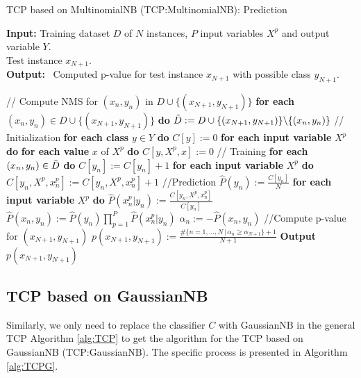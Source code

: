 \documentclass[10pt]{reportMaster}
\begin{document}
\begin{algorithm}[H]
\caption{TCP based on MultinomialNB (TCP:MultinomialNB): Prediction}\label{alg:TCPM}
\textbf{Input:} \; \; Training dataset $D$ of $N$ instances, $P$ input variables $X^p$ and output variable $Y$.\\
\hspace*{\algorithmicindent} \quad \quad \; \; Test instance $x_{N+1}$.\\
\textbf{Output:} \, Computed p-value for test instance $x_{N+1}$ with possible class $y_{N+1}$.

\begin{algorithmic}[1]
\State // Compute NMS for $ (x_n, y_n)$ in $D \cup \{(x_{N+1},y_{N+1})\}$
\State \textbf{for each} $(x_n,y_n) \in D \cup \{(x_{N+1},y_{N+1})\}$ \textbf{do}
\State \qquad $\Tilde{D}:= D \cup \{(x_{N+1},y_{N+1})\} \backslash \{(x_n,y_n)\}$
\State \qquad // Initialization
\State \qquad \textbf{for each class} $y \in Y$ \textbf{do}
\State \qquad \qquad $C[y] := 0$
\State \qquad \qquad \textbf{for each input variable} $X^p$ \textbf{do}
\State \qquad \qquad \qquad \textbf{for each value} $x$ of $X^p$ \textbf{do}
\State \qquad \qquad \qquad \qquad $C[y,X^p,x] := 0$
\State \qquad // Training
\State \qquad \textbf{for each} $(x_n,y_n) \in \Tilde{D}$ \textbf{do}
\State \qquad \qquad $C[y_n] := C[y_n]+1$
\State \qquad \qquad \textbf{for each input variable} $X^p$ \textbf{do}
\State \qquad \qquad \qquad $C[y_n,X^p,x_n^p]:=C[y_n,X^p,x_n^p]+1$
\State \qquad //Prediction
\State \qquad $\hat{P}(y_n) := \frac{C[y_n]}{N}$
\State \qquad \textbf{for each input variable} $X^p$ \textbf{do}
\State \qquad \qquad $\hat{P}(x_n^p|y_n):=\frac{C[y_n,X^p,x_n^p]}{C[y_n]}$
\State \qquad $\hat{P}(x_n,y_n):=\hat{P}(y_n) \prod_{p=1}^P \hat{P}(x_n^p|y_n)$
\State \qquad $\alpha_n := -\hat{P}(x_n, y_n)$
\State //Compute p-value for $(x_{N+1},y_{N+1})$
\State $p(x_{N+1},y_{N+1}):=\frac{\#\{n=1,...,N \,|\, \alpha_n \geq \alpha_{N+1}\}+1}{N+1}$
\State \textbf{Output} $p(x_{N+1},y_{N+1})$
\end{algorithmic}
\end{algorithm}


\subsection{TCP based on GaussianNB}

Similarly, we only need to replace the classifier $C$ with GaussianNB in the general TCP Algorithm \ref{alg:TCP} to get the algorithm for the TCP based on GaussianNB (TCP:GaussianNB). The specific process is presented in Algorithm \ref{alg:TCPG}. \\
\end{document}
